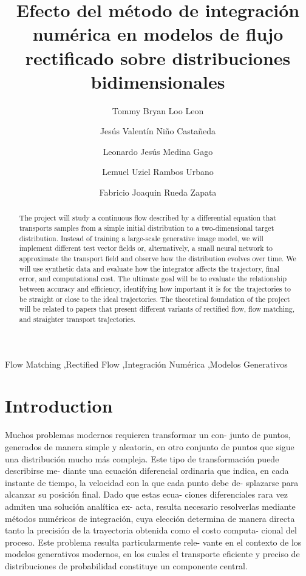 \documentclass[final,5p,times,twocolumn,authoryear]{elsarticle}
\begin{document}
\begin{frontmatter}

\title{Efecto del método de integración numérica en modelos de flujo rectificado sobre distribuciones bidimensionales}

\author[first]{Tommy Bryan Loo Leon}
\author[first]{Jesús Valentín Niño Castañeda}
\author[first]{Leonardo Jesús Medina Gago}
\author[first]{Lemuel Uziel Rambos Urbano}
\author[first]{Fabricio Joaquin Rueda Zapata}


\begin{abstract}
The project will study a continuous flow described by a differential equation that transports samples from a simple initial distribution to a two-dimensional target distribution. Instead of training a large-scale generative image model, we will implement different test vector fields or, alternatively, a small neural network to approximate the transport field and observe how the distribution evolves over time. We will use synthetic data and evaluate how the integrator affects the trajectory, final error, and computational cost. The ultimate goal will be to evaluate the relationship between accuracy and efficiency, identifying how important it is for the trajectories to be straight or close to the ideal trajectories. The theoretical foundation of the project will be related to papers that present different variants of rectified flow, flow matching, and straighter transport trajectories.
\end{abstract}

\begin{keyword}
Flow Matching \sep Rectified Flow \sep Integración Numérica \sep Modelos Generativos
\end{keyword}

\end{frontmatter}


\section{Introduction}
\label{introduction}

Muchos problemas modernos requieren transformar un con-
junto de puntos, generados de manera simple y aleatoria, en
otro conjunto de puntos que sigue una distribución mucho más
compleja. Este tipo de transformación puede describirse me-
diante una ecuación diferencial ordinaria que indica, en cada
instante de tiempo, la velocidad con la que cada punto debe de-
splazarse para alcanzar su posición final. Dado que estas ecua-
ciones diferenciales rara vez admiten una solución analítica ex-
acta, resulta necesario resolverlas mediante métodos numéricos
de integración, cuya elección determina de manera directa tanto
la precisión de la trayectoria obtenida como el costo computa-
cional del proceso. Este problema resulta particularmente rele-
vante en el contexto de los modelos generativos modernos, en
los cuales el transporte eficiente y preciso de distribuciones de
probabilidad constituye un componente central.
\end{document}
